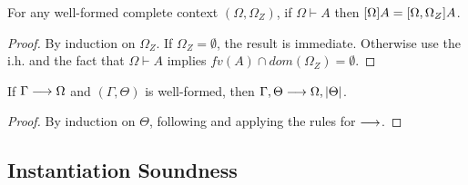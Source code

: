 \begin{mlemma}
  For any well-formed complete context $(\Omega, \Omega_Z)$, if $\Omega \vdash A$
  then $[\Omega]A = [\Omega,\Omega_Z]A$.
  \label{lemma:subst_stable}
\end{mlemma}
\begin{proof}
  By induction on $\Omega_Z$. If $\Omega_Z = \emptyset$, the result is
  immediate. Otherwise use the i.h. and the fact that $\Omega \vdash A$ implies
  $\mathit{fv}(A) \cap \mathit{dom}(\Omega_Z) = \emptyset$.
\end{proof}


\begin{mlemma}
  If $\Gamma \longrightarrow \Omega$ and $(\Gamma, \Theta)$ is well-formed, then $\Gamma,
  \Theta \longrightarrow \Omega, |\Theta|$.
  \label{lemma:filling_completes}
\end{mlemma}
\begin{proof}
  By induction on $\Theta$, following  and applying
  the rules for $\longrightarrow$.
\end{proof}



\subsection{Instantiation Soundness}

